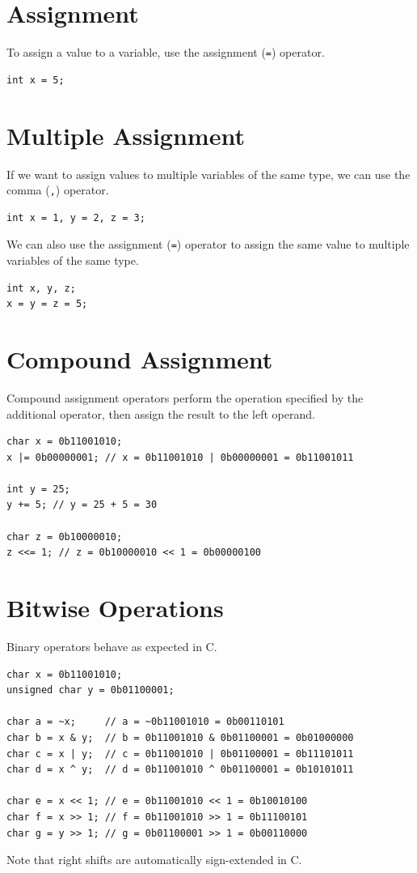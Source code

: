 \documentclass{report}
\begin{document}
\section{Assignment}
To assign a value to a variable, use the assignment (\texttt{=}) operator.
\begin{verbatim}
int x = 5;
\end{verbatim}
\section{Multiple Assignment}
If we want to assign values to multiple variables of the same type, we can use the comma (\texttt{,}) operator.
\begin{verbatim}
int x = 1, y = 2, z = 3;
\end{verbatim}
We can also use the assignment (\texttt{=}) operator to assign the same value to multiple variables of the same type.
\begin{verbatim}
int x, y, z;
x = y = z = 5;
\end{verbatim}
\section{Compound Assignment}
Compound assignment operators perform the operation specified by the additional operator,
then assign the result to the left operand.
\begin{verbatim}
char x = 0b11001010;
x |= 0b00000001; // x = 0b11001010 | 0b00000001 = 0b11001011

int y = 25;
y += 5; // y = 25 + 5 = 30

char z = 0b10000010;
z <<= 1; // z = 0b10000010 << 1 = 0b00000100
\end{verbatim}
\section{Bitwise Operations}
Binary operators behave as expected in C.
\begin{verbatim}
char x = 0b11001010;
unsigned char y = 0b01100001;

char a = ~x;     // a = ~0b11001010 = 0b00110101
char b = x & y;  // b = 0b11001010 & 0b01100001 = 0b01000000
char c = x | y;  // c = 0b11001010 | 0b01100001 = 0b11101011
char d = x ^ y;  // d = 0b11001010 ^ 0b01100001 = 0b10101011

char e = x << 1; // e = 0b11001010 << 1 = 0b10010100
char f = x >> 1; // f = 0b11001010 >> 1 = 0b11100101
char g = y >> 1; // g = 0b01100001 >> 1 = 0b00110000
\end{verbatim}
Note that right shifts are automatically sign-extended in C.
\end{document}
